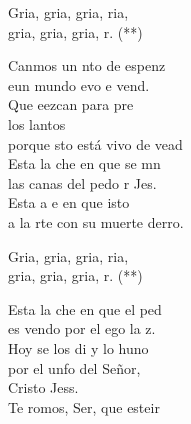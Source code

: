 \begin{cancion}
	\begin{chorus}%
	Gria, gria, gria, ria,\\
	gria, gria, gria, r. (**)\\
	\end{chorus}%
	Canmos un nto de espenz\\
	eun mundo evo e vend.  \\
	Que eezcan para pre \\
	los lantos\\
	porque sto está vivo de vead\\
	Esta  la che en que se mn\\
	las canas del pedo r Jes.\\
	Esta a e en que isto\\
	a la rte con su muerte derro. \\
	\begin{chorus}%
	Gria, gria, gria, ria,\\
	gria, gria, gria, r. (**)\\
	\end{chorus}%
	Esta  la che en que el ped\\
	es vendo por el ego  la z.\\
	Hoy se  los di y lo huno\\
	por el unfo del Señor, \\
	Cristo Jess. \\
	Te romos, Ser, que esteir\\

\end{cancion}
